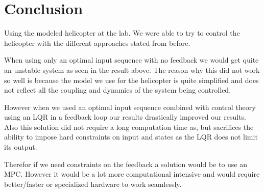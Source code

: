 \section{Conclusion}\label{sec:conclusion}

Using the modeled helicopter at the lab. We were able to try to control the helicopter with the different approaches stated from before. 

When using only an optimal input sequence with no feedback we would get quite an unstable system as seen in the result above. The reason why this did not work so well is because the model we use for the helicopter is quite simplified and does not reflect all the coupling and dynamics of the system being controlled.

However when we used an optimal input sequence combined with control theory using an LQR in a feedback loop our results drastically improved our results. Also this solution did not require a long computation time as, but sacrifices the ability to impose hard constraints on input and states as the LQR does not limit its output.

Therefor if we need constraints on the feedback a solution would be to use an MPC. However it would be a lot more computational intensive and would require better/faster or specialized hardware to work seamlessly.


